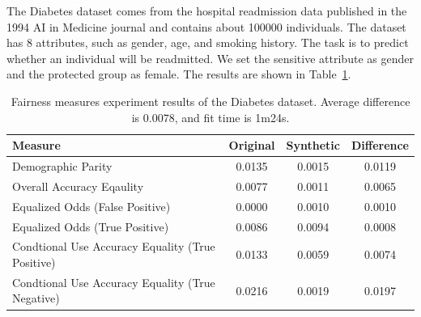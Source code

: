 \documentclass[manuscript,screen,review,anonymous]{acmart}
\begin{document}
The Diabetes\cite{diabetes_34,Kaggle_Diabetes_Prediction} dataset comes from the hospital readmission data published in the 1994 AI in Medicine journal and contains about 100000 individuals. The dataset has 8 attributes, such as gender, age, and smoking history. The task is to predict whether an individual will be readmitted. We set the sensitive attribute as gender and the protected group as female. The results are shown in Table~\ref{tab:diabetes_score}.




\begin{table}[h]
\caption{
    Fairness measures experiment results of the Diabetes dataset.
    Average difference is $0.0078$, and fit time is 1m24s.
}
\label{tab:diabetes_score}
\begin{tabular}{lccc}
\toprule
\textbf{Measure} & \textbf{Original} & \textbf{Synthetic} & \textbf{Difference} \\
\midrule
Demographic Parity  & 0.0135 & 0.0015 & 0.0119 \\
Overall Accuracy Eqaulity   & 0.0077 & 0.0011 & 0.0065 \\
Equalized Odds (False Positive)    & 0.0000 & 0.0010 & 0.0010 \\
Equalized Odds (True Positive)    & 0.0086 & 0.0094 & 0.0008 \\
Condtional Use Accuracy Equality (True Positive) & 0.0133 & 0.0059 & 0.0074 \\
Condtional Use Accuracy Equality (True Negative) & 0.0216 & 0.0019 & 0.0197 \\
\bottomrule
\end{tabular}
\end{table}
\end{document}
